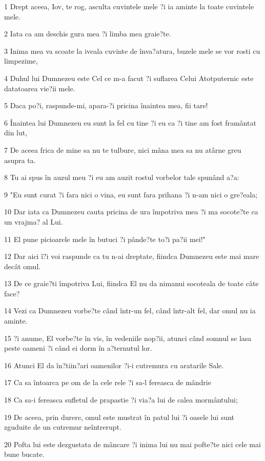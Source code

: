 \par 1 Drept aceea, Iov, te rog, asculta cuvintele mele ?i ia aminte la toate cuvintele mele.
\par 2 Iata ca am deschis gura mea ?i limba mea graie?te.
\par 3 Inima mea va scoate la iveala cuvinte de înva?atura, buzele mele se vor rosti cu limpezime,
\par 4 Duhul lui Dumnezeu este Cel ce m-a facut ?i suflarea Celui Atotputernic este datatoarea vie?ii mele.
\par 5 Daca po?i, raspunde-mi, apara-?i pricina înaintea mea, fii tare!
\par 6 Înaintea lui Dumnezeu eu sunt la fel cu tine ?i eu ca ?i tine am fost framântat din lut,
\par 7 De aceea frica de mine sa nu te tulbure, nici mâna mea sa nu atârne greu asupra ta.
\par 8 Tu ai spus în auzul meu ?i eu am auzit rostul vorbelor tale spunând a?a:
\par 9 "Eu sunt curat ?i fara nici o vina, eu sunt fara prihana ?i n-am nici o gre?eala;
\par 10 Dar iata ca Dumnezeu cauta pricina de ura împotriva mea ?i ma socote?te ca un vrajma? al Lui.
\par 11 El pune picioarele mele în butuci ?i pânde?te to?i pa?ii mei!"
\par 12 Dar aici î?i voi raspunde ca tu n-ai dreptate, fiindca Dumnezeu este mai mare decât omul.
\par 13 De ce graie?ti împotriva Lui, fiindca El nu da nimanui socoteala de toate câte face?
\par 14 Vezi ca Dumnezeu vorbe?te când într-un fel, când într-alt fel, dar omul nu ia aminte.
\par 15 ?i anume, El vorbe?te în vis, în vedeniile nop?ii, atunci când somnul se lasa peste oameni ?i când ei dorm în a?ternutul lor.
\par 16 Atunci El da în?tiin?ari oamenilor ?i-i cutremura cu aratarile Sale.
\par 17 Ca sa întoarca pe om de la cele rele ?i sa-l fereasca de mândrie
\par 18 Ca sa-i fereasca sufletul de prapastie ?i via?a lui de calea mormântului;
\par 19 De aceea, prin durere, omul este mustrat în patul lui ?i oasele lui sunt zguduite de un cutremur neîntrerupt.
\par 20 Pofta lui este dezgustata de mâncare ?i inima lui nu mai pofte?te nici cele mai bune bucate.
